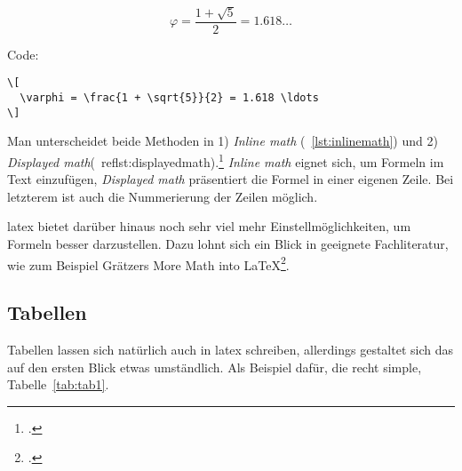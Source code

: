 \[
  \varphi = \frac{1 + \sqrt{5}}{2} = 1.618 \ldots
\]

Code:

\begin{lstlisting}[float=htpb,caption=Darstellungen von Mathe mit der \glqq displayed math\grqq-Methode,label=lst:displayermath]
\[
  \varphi = \frac{1 + \sqrt{5}}{2} = 1.618 \ldots
\]
\end{lstlisting}

Man unterscheidet beide Methoden in 1) \emph{Inline math} (~\ref{lst:inlinemath}) und 2) \emph{Displayed math}(~ref{lst:displayedmath}).\footcite[Vgl. ][S. 276]{kottwitz_latex_2015} \emph{Inline math} eignet sich, um Formeln im Text einzufügen, \emph{Displayed math} präsentiert die Formel in einer eigenen Zeile. Bei letzterem ist auch die Nummerierung der Zeilen möglich.

\gls{latex} bietet darüber hinaus noch sehr viel mehr Einstellmöglichkeiten, um Formeln besser darzustellen. Dazu lohnt sich ein Blick in geeignete Fachliteratur, wie zum Beispiel Grätzers \glqq More Math into \LaTeX{}\grqq\footcite[][]{gratzer_more_2016}.
\subsection{Tabellen}%
\label{sec:tables}
Tabellen lassen sich natürlich auch in \gls{latex} schreiben, allerdings gestaltet sich das auf den ersten Blick etwas umständlich. Als Beispiel dafür, die recht simple, Tabelle~\ref{tab:tab1}.
\begin{table}[htbp]
\caption{Eine einfache Tabelle}
\label{tab:tab1}
\end{table}

